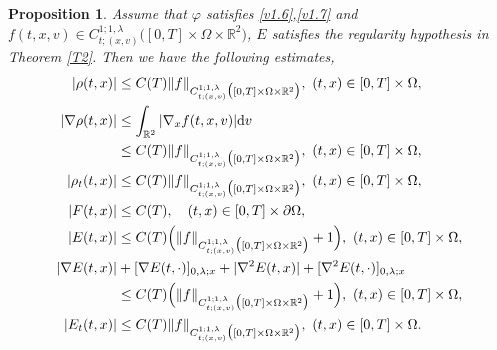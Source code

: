 \documentclass[11pt,reqno]{amsart}%
\newtheorem{Proposition}{Proposition}[section]
\theoremstyle{definition}
\theoremstyle{remark}
\begin{document}
\begin{Proposition}\label{P3}
Assume that $\varphi$ satisfies \eqref{v1.6},\eqref{v1.7} and $f(t,x,v)\in C^{1;1,\lambda}_{t;(x,v)}\big([0,T] \times\Omega\times\mathbb{R}^{2}\big)$, $E$ satisfies the regularity hypothesis in Theorem \ref{T2}. Then we have the following estimates,
\begin{align}
|\rho(t,x)|&\leq C(T)\|f\|_{C^{1;1,\lambda}_{t;(x,v)}\big([0,T]\times\Omega\times\mathbb{R}^{2}\big)},\,\,(t,x)\in[0,T]\times\Omega,\label{v5.8}\\
|\nabla\rho(t,x)|&\leq\int_{\mathbb{R}^{2}}|\nabla _{x}f(t,x,v)|{\rm d}v \nonumber\\
&\leq C(T)\|f\|_{C^{1;1,\lambda}_{t;(x,v)}\big([0,T]\times\Omega\times\mathbb{R}^{2}\big)},\,\,(t,x)\in[0,T]\times\Omega,\label{v5.9}\\
|\rho_{t}(t,x)|&\leq C(T)\|f\|_{C^{1;1,\lambda}_{t;(x,v)}\big([0,T]\times\Omega\times\mathbb{R}^{2}\big)},\,\,(t,x)\in[0,T]\times\Omega,\label{v5.10}\\
|F(t,x)|&\leq C(T),\quad (t,x)\in[0,T]\times\partial\Omega,\label{v5.11}\\
|E(t,x)|&\leq C(T)\Big(\|f\|_{C^{1;1,\lambda}_{t;(x,v)}\big([0,T]\times\Omega\times\mathbb{R}^{2}\big)}+1\Big),\,\,(t,x)\in[0,T]\times\Omega,\label{v5.12}\\
|\nabla E(t,x)|&+[\nabla E(t,\cdot)]_{0,\lambda;x}+|\nabla^{2}E(t,x)|+[\nabla^{2} E(t,\cdot)]_{0,\lambda;x}\nonumber\\
&\leq C(T)\Big(\|f\|_{C^{1;1,\lambda}_{t;(x,v)}\big([0,T]\times\Omega\times\mathbb{R}^{2}\big)}+1\Big),\,\,(t,x)\in[0,T]\times\Omega,\label{v5.13}\\
|E_{t}(t,x)|&\leq C(T)\|f\|_{C^{1;1,\lambda}_{t;(x,v)}\big([0,T]\times\Omega\times\mathbb{R}^{2}\big)},\,\,(t,x)\in[0,T]\times\Omega.\label{v5.14}
\end{align}
\end{Proposition}
\end{document}

